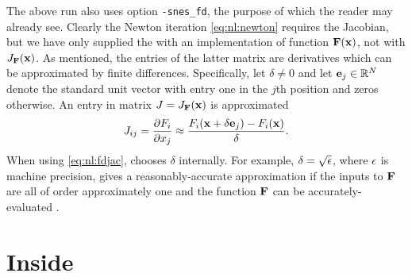 The above run also uses option \texttt{-snes\_fd}, the purpose of which the reader may already see.  Clearly the Newton iteration \eqref{eq:nl:newton} requires the Jacobian, but we have only supplied the \pSNES with an implementation of function $\mathbf{F}(\mathbf{x})$, not with $J_{\mathbf{F}}(\mathbf{x})$.  As mentioned, the entries of the latter matrix are derivatives which can be approximated by finite differences.  Specifically, let $\delta\ne 0$ and let $\mathbf{e}_j\in \mathbb{R}^N$ denote the standard unit vector with entry one in the $j$th position and zeros otherwise.  An entry in matrix $J=J_{\mathbf{F}}(\mathbf{x})$ is approximated
\begin{equation}
J_{ij} = \frac{\partial F_i}{\partial x_j} \approx \frac{F_i(\mathbf{x}+\delta \mathbf{e}_j) - F_i(\mathbf{x})}{\delta}.  \label{eq:nl:fdjac}
\end{equation}
When using \eqref{eq:nl:fdjac}, \PETSc chooses $\delta$ internally.  For example, $\delta = \sqrt{\epsilon}$, where $\epsilon$ is machine precision, gives a reasonably-accurate approximation if the inputs to $\mathbf{F}$ are all of order approximately one and the function $\mathbf{F}$ can be accurately-evaluated \citep{Kelley2003}.


\section{Inside \pSNES} \label{sec:insidesnes}

